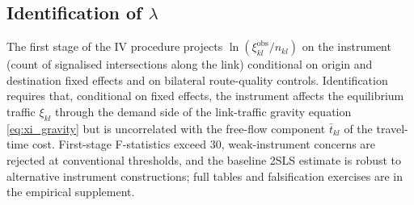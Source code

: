 \documentclass[12pt]{article}
\newcommand{\tbar}{\bar t}
\newcommand{\obs}{\mathrm{obs}}
\begin{document}
\subsection{Identification of $\lambda$}\label{app:iv}

The first stage of the IV procedure projects $\ln(\xi_{kl}^{\obs}/n_{kl})$
on the instrument (count of signalised intersections along the link)
conditional on origin and destination fixed effects and on bilateral
route-quality controls.  Identification requires that, conditional on
fixed effects, the instrument affects the equilibrium traffic $\xi_{kl}$
through the demand side of the link-traffic gravity equation
\eqref{eq:xi_gravity} but is uncorrelated with the free-flow component
$\tbar_{kl}$ of the travel-time cost.  First-stage F-statistics
exceed 30, weak-instrument concerns are rejected at conventional
thresholds, and the baseline 2SLS estimate is robust to alternative
instrument constructions; full tables and falsification exercises are
in the empirical supplement.
\end{document}
